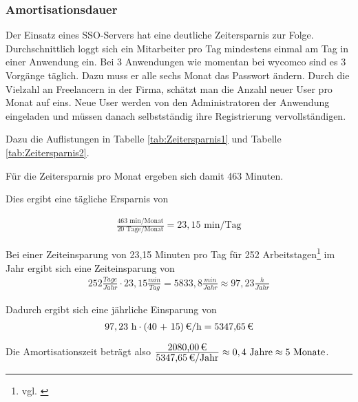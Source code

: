 

\subsubsection{Amortisationsdauer}
\label{sec:Amortisationsdauer}

Der Einsatz eines \acs{SSO}-Servers hat eine deutliche Zeitersparnis zur Folge. Durchschnittlich loggt sich ein Mitarbeiter pro Tag mindestens einmal am Tag in einer Anwendung ein. Bei 3 Anwendungen wie momentan bei wycomco sind es 3 Vorgänge täglich. Dazu muss er alle sechs Monat das Passwort ändern. Durch die Vielzahl an Freelancern in der Firma, schätzt man die Anzahl neuer User pro Monat auf eins. Neue User werden von den Administratoren der Anwendung eingeladen und müssen danach selbstständig ihre Registrierung vervollständigen. 

Dazu die Auflistungen in Tabelle \ref{tab:Zeitersparnis1} und Tabelle \ref{tab:Zeitersparnis2}.



Für die Zeitersparnis pro Monat ergeben sich damit 463 Minuten. 

Dies ergibt eine tägliche Ersparnis von

\begin{eqnarray}
\frac{463 \mbox{ min/Monat}}{20 \mbox{ Tage/Monat}} = 23,15 \mbox{ min/Tag}
\end{eqnarray}

Bei einer Zeiteinsparung von 23,15 Minuten pro Tag für 252 Arbeitstagen\footnote{vgl. \cite{arbeitstage}} im Jahr ergibt sich eine Zeiteinsparung von 
\begin{eqnarray}
252 \frac{Tage}{Jahr} \cdot 23,15 \frac{min}{Tag} = 5833,8 \frac{min}{Jahr} \approx 97,23 \frac{h}{Jahr} 
\end{eqnarray}

Dadurch ergibt sich eine jährliche Einsparung von 
\begin{eqnarray}
97,23 \mbox{ h} \cdot \eur{(40 + 15)}{\mbox{/h}} = \eur{5347,65}
\end{eqnarray}

Die Amortisationszeit beträgt also $\frac{\eur{2080,00}}{\eur{5347,65}\mbox{/Jahr}} \approx 0,4 \mbox{ Jahre} \approx 5 \mbox{ Monate}$.

